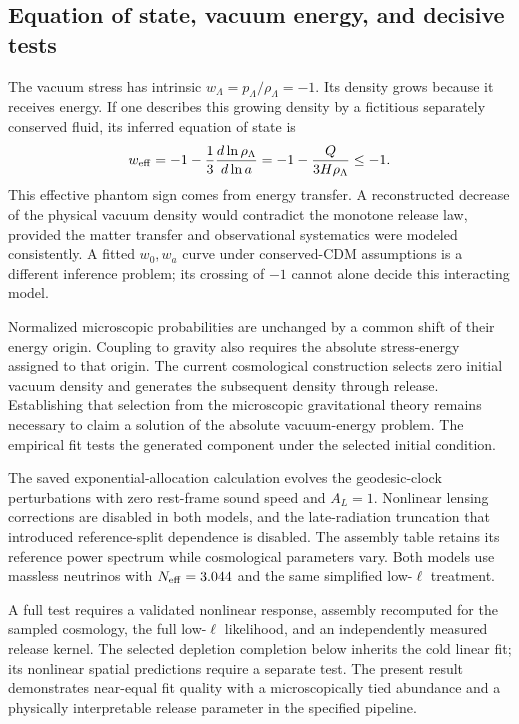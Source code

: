 \subsection{Equation of state, vacuum energy, and decisive tests}

The vacuum stress has intrinsic $w_\Lambda=p_\Lambda/\rho_\Lambda=-1$.
Its density grows because it receives energy. If one describes this
growing density by a fictitious separately conserved fluid, its inferred
equation of state is
\begin{equation}
w_{\rm eff}=-1-\frac{1}{3}\frac{d\ln\rho_\Lambda}{d\ln a}
=-1-\frac{Q}{3H\rho_\Lambda}\le-1.
\end{equation}
This effective phantom sign comes from energy transfer. A reconstructed
decrease of the physical vacuum density would contradict the monotone
release law, provided the matter transfer and observational systematics
were modeled consistently. A fitted $w_0,w_a$ curve under conserved-CDM
assumptions is a different inference problem; its crossing of $-1$
cannot alone decide this interacting model.

Normalized microscopic probabilities are unchanged by a common shift
of their energy origin. Coupling to gravity also requires the absolute
stress-energy assigned to that origin. The current cosmological
construction selects zero initial vacuum density and generates the
subsequent density through release. Establishing that selection from the
microscopic gravitational theory remains necessary to claim a solution
of the absolute vacuum-energy problem. The empirical fit tests the
generated component under the selected initial condition.

The saved exponential-allocation calculation evolves the geodesic-clock perturbations with
zero rest-frame sound speed and $A_L=1$. Nonlinear lensing corrections
are disabled in both models, and the late-radiation truncation that
introduced reference-split dependence is disabled. The assembly table
retains its reference power spectrum while cosmological parameters vary.
Both models use massless neutrinos with $N_{\rm eff}=3.044$ and the
same simplified low-$\ell$ treatment. 

A full test requires a validated nonlinear response, assembly recomputed
for the sampled cosmology, the full low-$\ell$ likelihood, and an
independently measured release kernel. The selected depletion completion below inherits the cold linear fit;
its nonlinear spatial predictions require a separate test.
The present result demonstrates near-equal fit quality with a
microscopically tied abundance and a physically interpretable release
parameter in the specified pipeline.

